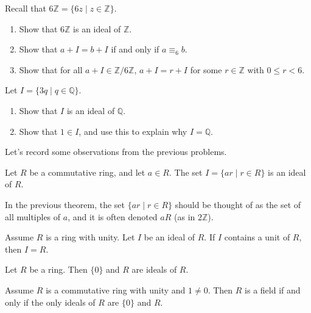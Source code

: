 \begin{problem}\label{prob.RepresentIntegerIdealsWithSmallNumber}
Recall that $6\mathbb{Z} = \{6z \mid z\in \mathbb{Z}\}$.
\begin{enumerate}
\item Show that $6\mathbb{Z}$ is an ideal of $\mathbb{Z}$.
\item Show that $a + I = b + I$ if and only if $a \equiv_6 b$.
\item Show that for all $a + I\in\mathbb{Z}/6\mathbb{Z}$, $a + I = r + I$ for some $r \in \mathbb{Z}$ with $0 \le r < 6$.
\end{enumerate}
\end{problem}

\begin{problem}
Let $I = \{3q \mid q\in \mathbb{Q}\}$.
\begin{enumerate}
\item Show that $I$ is an ideal of $\mathbb{Q}$.
\item Show that $1\in I$, and use this to explain why $I =  \mathbb{Q}$.
\end{enumerate}
\end{problem}

Let's record some observations from the previous problems.

\begin{theorem}\label{thm.IdealContainingUnitsEqualsR}
Let $R$ be a commutative ring, and let $a\in R$. The set $I = \{ar\mid r\in R\}$ is an ideal of $R$.
\end{theorem}

In the previous theorem, the set $\{ar\mid r\in R\}$ should be thought of as the set of all multiples of $a$, and it is often denoted $aR$ (as in $2\mathbb{Z}$).

\begin{theorem}\label{thm.IdealContainingUnitsEqualsR}
Assume $R$ is a ring with unity. Let $I$ be an ideal of $R$. If $I$ contains a unit of $R$, then $I = R$.
\end{theorem}

\begin{theorem}
Let $R$ be a ring. Then $\{0\}$ and $R$ are ideals of $R$.
\end{theorem}

\begin{theorem}
Assume $R$ is a commutative ring with unity and $1\neq 0$. Then $R$ is a field if and only if the only ideals of $R$ are $\{0\}$ and $R$.
\end{theorem}

